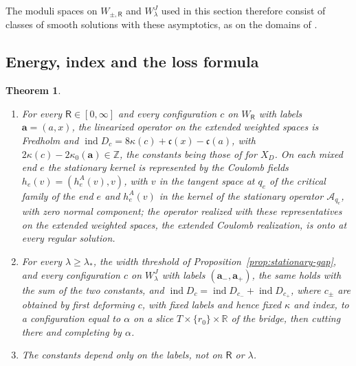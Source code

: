 \documentclass[11pt]{amsart}
\newtheorem{theorem}{Theorem}[section]
\theoremstyle{definition}
\theoremstyle{remark}
\theoremstyle{plain}
\numberwithin{equation}{section}
\newcommand{\ZZ}{\mathbb{Z}}
\newcommand{\RR}{\mathbb{R}}
\newcommand{\ind}{\operatorname{ind}}
\begin{document}
The moduli spaces on $W_{\pm,\mathsf R}$ and $W^J_\lambda$ used in this section therefore consist of
classes of smooth solutions with these asymptotics, as on the domains of
\cite[Proposition~3.6]{DFL}.

\subsection{Energy, index and the loss formula}

\begin{theorem}\label{thm:torus-period}
\begin{enumerate}[label=(\roman*)]
\item For every $\mathsf R\in[0,\infty]$ and every configuration $c$ on $W_\mathsf R$
  with labels $\mathbf a=(a,x)$, the linearized operator on the extended weighted spaces is Fredholm and $\ind D_c=8\kappa(c)+\mathfrak c(x)-\mathfrak c(a)$, with
  $2\kappa(c)-2\kappa_0(\mathbf a)\in\ZZ$, the constants being those of
  \cite[Proposition~3.20]{DFL} for $X_D$. On each mixed end $e$ the stationary kernel is
  represented by the Coulomb fields $h_e(v)=(h_e^A(v),v)$, with $v$ in the tangent space at
  $q_e$ of the critical family of the end $e$ and $h_e^A(v)$ in the kernel of the stationary
  operator $\mathcal A_{q_e}$, with zero normal component; the operator realized with these
  representatives on the extended weighted spaces, the \emph{extended Coulomb realization},
  is onto at every regular solution.
\item For every $\lambda\ge\lambda_*$, the width threshold of
  Proposition~\ref{prop:stationary-gap}, and every configuration $c$ on $W^J_\lambda$ with labels
  $(\mathbf a_-,\mathbf a_+)$, the same holds with the sum of the two constants, and
  $\ind D_c=\ind D_{c_-}+\ind D_{c_+}$, where $c_\pm$ are obtained by first
  deforming $c$, with fixed labels and hence fixed $\kappa$ and index, to a
  configuration equal to $\alpha$ on a slice $T\times\{r_0\}\times\RR$ of the bridge,
  then cutting there and completing by $\alpha$.
\item The constants depend only on the labels, not on $\mathsf R$ or $\lambda$.
\end{enumerate}
\end{theorem}
\end{document}

